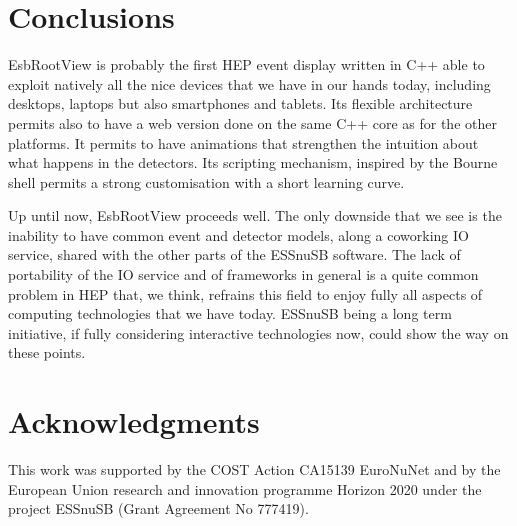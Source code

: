 \documentclass{webofc}
\begin{document}
\section{Conclusions}
EsbRootView is probably the first HEP event display written in C++ able to exploit
natively all the nice devices that we have in our hands today, including
desktops, laptops but also smartphones and tablets. Its flexible
architecture permits also to have a web version done on the same C++
core as for the other platforms. It permits to have
animations that strengthen the intuition about what happens in the
detectors. Its scripting mechanism, inspired by the Bourne
shell permits a strong customisation with a short learning curve.

Up until now, EsbRootView proceeds well. The only downside that we see is
the inability to have common event and detector models, along a
coworking IO service, shared with the other parts of the ESSnuSB software.
The lack of portability of the IO service and of frameworks in general is a quite common
problem in HEP that, we think, refrains this field to enjoy fully
all aspects of computing technologies that we have today. ESSnuSB being a long
term initiative, if fully considering interactive technologies now, could show the
way on these points.

\section{Acknowledgments}
This work was supported by the COST Action CA15139 EuroNuNet and by the European Union research and innovation programme Horizon 2020 under the project ESSnuSB (Grant Agreement No 777419).
\end{document}
